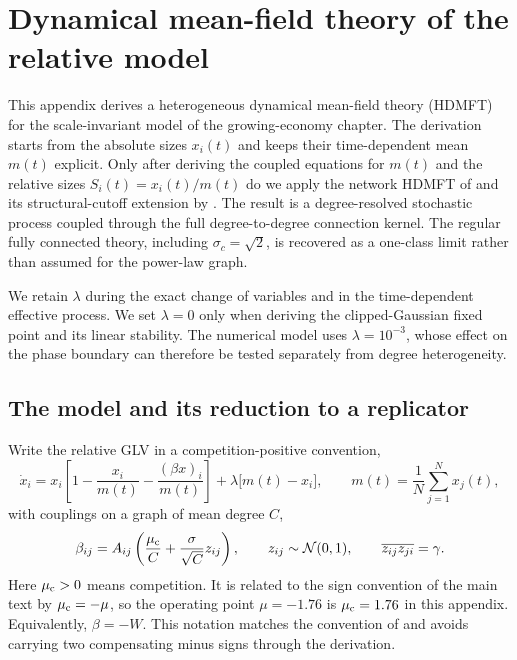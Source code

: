 \chapter{Dynamical mean-field theory of the relative model}
\label{app:dmft}
\providecommand{\Dz}{\mathcal{D}z}
\providecommand{\E}{\mathbb{E}}

This appendix derives a heterogeneous dynamical mean-field theory (HDMFT) for the scale-invariant
model of the growing-economy chapter.  The derivation starts from the absolute sizes $x_i(t)$ and
keeps their time-dependent mean $m(t)$ explicit.  Only after deriving the coupled equations for
$m(t)$ and the relative sizes $S_i(t)=x_i(t)/m(t)$ do we apply the network HDMFT of
\citet{aguirrelopez} and its structural-cutoff extension by \citet{patil2026}.  The result is a
degree-resolved stochastic process coupled through the full degree-to-degree connection kernel.
The regular fully connected theory, including $\sigma_c=\sqrt{2}$, is recovered as a one-class
limit rather than assumed for the power-law graph.

We retain $\lambda$ during the exact change of variables and in the time-dependent effective
process.  We set $\lambda=0$ only when deriving the clipped-Gaussian fixed point and its linear
stability.  The numerical model uses $\lambda=10^{-3}$, whose effect on the phase boundary can
therefore be tested separately from degree heterogeneity.

\section{The model and its reduction to a replicator}
\label{sec:dmft-model}

Write the relative GLV in a competition-positive convention,
\begin{equation}
    \dot x_i
    =x_i\left[1-\frac{x_i}{m(t)}-\frac{(\beta x)_i}{m(t)}\right]
      +\lambda\bigl[m(t)-x_i\bigr],
    \qquad
    m(t)=\frac1N\sum_{j=1}^N x_j(t),
    \label{eq:dmft-glv}
\end{equation}
with couplings on a graph of mean degree $C$,
\begin{equation}
    \beta_{ij}=A_{ij}\left(\frac{\mu_{\rm c}}{C}
                  +\frac{\sigma}{\sqrt C}z_{ij}\right),
    \qquad z_{ij}\sim\mathcal N(0,1),\qquad
    \overline{z_{ij}z_{ji}}=\gamma .
    \label{eq:dmft-couplings}
\end{equation}
Here $\mu_{\rm c}>0$ means competition.  It is related to the sign convention of the main text by
$\mu_{\rm c}=-\mu$, so the operating point $\mu=-1.76$ is $\mu_{\rm c}=1.76$ in this appendix.
Equivalently, $\beta=-W$.  This notation matches the convention of \citet{patil2026} and avoids
carrying two compensating minus signs through the derivation.

